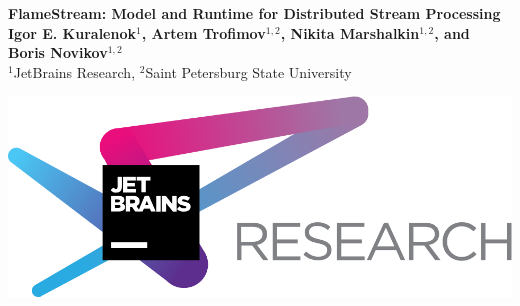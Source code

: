 \documentclass[a0,landscape]{a0poster}
\newcommand {\FlameStream} {FlameStream}
\begin{document}
\begin{minipage}[b]{0.83\linewidth}
  {\veryHuge \color{NavyBlue} \textbf{\FlameStream: Model and Runtime for Distributed Stream Processing}}\\
  \bigbreak
  {\huge \textbf{Igor E. Kuralenok$^1$, Artem Trofimov$^{1,2}$, Nikita Marshalkin$^{1,2}$, and Boris Novikov$^{1,2}$}}\\
  \bigbreak
  {\huge $^1$JetBrains Research, $^2$Saint Petersburg State University}
\end{minipage}
%
\begin{minipage}[b]{0.20\linewidth}
  \includegraphics[width=20cm]{pics/jetbrains.png} 
\end{minipage}

\vspace{1cm} 
\end{document}
